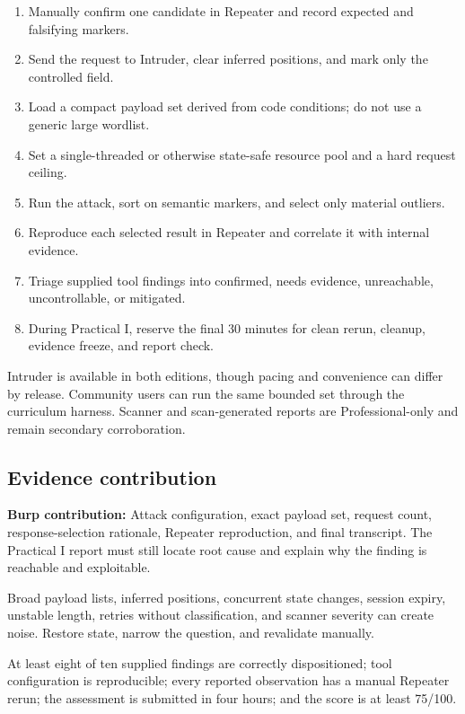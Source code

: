 \documentclass[11pt]{article}
\newcommand{\weekfield}[2]{%
  \Needspace{5\baselineskip}
  \subsection*{#1}
  #2
}
\newcommand{\burpevidence}[1]{\textbf{Burp contribution:} #1}
\begin{document}
\begin{procedurebox}
\begin{enumerate}
  \item Manually confirm one candidate in Repeater and record expected and falsifying markers.
  \item Send the request to Intruder, clear inferred positions, and mark only the controlled field.
  \item Load a compact payload set derived from code conditions; do not use a generic large wordlist.
  \item Set a single-threaded or otherwise state-safe resource pool and a hard request ceiling.
  \item Run the attack, sort on semantic markers, and select only material outliers.
  \item Reproduce each selected result in Repeater and correlate it with internal evidence.
  \item Triage supplied tool findings into confirmed, needs evidence, unreachable, uncontrollable, or mitigated.
  \item During Practical I, reserve the final 30 minutes for clean rerun, cleanup, evidence freeze, and report check.
\end{enumerate}
\end{procedurebox}

\begin{editionbox}
Intruder is available in both editions, though pacing and convenience can differ
by release. Community users can run the same bounded set through the curriculum
harness. Scanner and scan-generated reports are Professional-only and remain
secondary corroboration.
\end{editionbox}

\weekfield{Evidence contribution}{\burpevidence{Attack configuration, exact
payload set, request count, response-selection rationale, Repeater reproduction,
and final transcript.} The Practical I report must still locate root cause and
explain why the finding is reachable and exploitable.}

\begin{troubleshootingbox}
Broad payload lists, inferred positions, concurrent state changes, session
expiry, unstable length, retries without classification, and scanner severity
can create noise. Restore state, narrow the question, and revalidate manually.
\end{troubleshootingbox}

\begin{checkpoints}
At least eight of ten supplied findings are correctly dispositioned; tool
configuration is reproducible; every reported observation has a manual Repeater
rerun; the assessment is submitted in four hours; and the score is at least
75/100.
\end{checkpoints}
\end{document}
